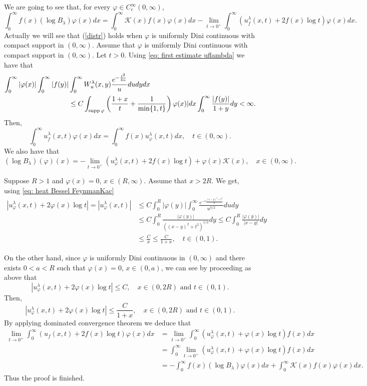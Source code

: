 \documentclass[a4paper,10pt, reqno]{amsart}
\theoremstyle{definition}
\theoremstyle{remark}
\numberwithin{equation}{section}
\begin{document}
We are going to see that, for every $\varphi \in C_c^\infty(0,\infty)$,
\begin{equation}\label{distr}
\int_0^\infty f(x)(\log B_\lambda)\varphi (x)dx=\int_0^\infty \mathcal K(x)f(x)\varphi (x)dx-\lim_{t\rightarrow 0^+}\int_0^\infty (u_f^\lambda (x,t)+2f(x)\log t)\varphi (x)dx.
\end{equation}
Actually we will see that (\ref{distr}) holds when $\varphi$ is uniformly Dini continuous with compact support in $(0,\infty)$. Assume that $\varphi$ is uniformly Dini continuous with compact support in $(0,\infty)$. Let $t>0$. Using \eqref{eq: first estimate uflambda} we have that 
\begin{align*}
\int_0^\infty |\varphi (x)|\int_0^\infty |f(y)|&\int_0^\infty W_u^\lambda (x,y)\frac{e^{-\frac{t^2}{4u}}}{u}dudydx\\
&\leq C\int_{{\rm supp }\,\varphi}\left(\frac{1+x}{t}+\frac{1}{\min\{1,t\}}\right)\varphi (x)|dx\int_0^\infty \frac{|f(y)|}{1+y}dy<\infty.
\end{align*}
Then,
\[
\int_0^\infty u_f^\lambda (x,t)\varphi (x)dx=\int_0^\infty f(x)u_\varphi ^\lambda (x,t)dx,\quad t\in (0,\infty).
\]
We also have that
\[
(\log B_\lambda)(\varphi )(x)=-\lim_{t\rightarrow 0^+}(u_\varphi ^\lambda (x,t)+2f(x)\log t)+\varphi (x)\mathcal K(x),\quad x\in (0,\infty).
\]

Suppose $R>1$ and $\varphi (x)=0$, $x\in (R,\infty)$. Assume that $x>2R$. We get, using \eqref{eq: heat Bessel FeynmanKac}
\begin{align*}
|u_\varphi^\lambda (x,t)+2\varphi (x)\log t|=|u_\varphi^\lambda (x,t)|&\leq C\int_0^R|\varphi(y)|\int_0^\infty \frac{e^{-c\frac{(x-y)^2+t^2}{u}}}{u^{3/2}}dudy\\
&\leq C\int_0^R\frac{|\varphi (y)|}{((x-y)^2+t^2)^{1/2}}dy\leq C\int_0^R\frac{|\varphi (y)|}{|x-y|}dy\\
&\leq \frac{C}{x}\leq \frac{C}{1+x},\quad t\in (0,1).
\end{align*}

On the other hand, since $\varphi$ is uniformly Dini continuous in $(0,\infty)$ and there exists $0<a<R$ such that $\varphi (x)=0$, $x\in (0,a)$, we can see by proceeding as above that
\[
|u_\varphi ^\lambda (x,t)+2\varphi (x)\log t|\leq C,\quad x\in (0,2R)\mbox{ and }t\in (0,1).
\]
Then, 
\[
|u_\varphi ^\lambda (x,t)+2\varphi (x)\log t|\leq \frac{C}{1+x},\quad x\in (0,2R)\mbox{ and }t\in (0,1).
\]
By applying dominated convergence theorem we deduce that
\begin{align*}
    \lim_{t\rightarrow 0^+}\int_0^\infty (u_f(x,t)+2f(x)\log t)\varphi (x)dx&=\lim_{t\rightarrow 0^+}\int_0^\infty(u_\varphi ^\lambda (x,t)+\varphi (x)\log t)f(x)dx\\
    &=\int_0^\infty \lim_{t\rightarrow 0^+}(u_\varphi ^\lambda (x,t)+\varphi (x)\log t)f(x)dx\\
    &=-\int_0^\infty f(x)(\log B_\lambda)\varphi (x)dx+\int_0^\infty \mathcal K(x)f(x)\varphi (x)dx.
\end{align*}
Thus the proof is finished.
\end{document}
